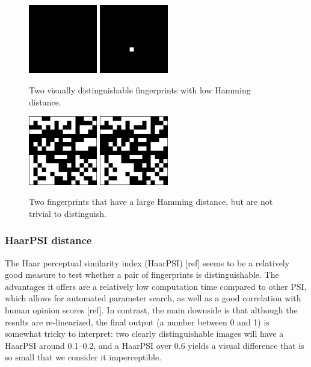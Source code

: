 \documentclass{article}
\begin{document}
\begin{figure}[h]
    \centering
    \includegraphics[width=3cm]{figures/0000000000000.png}
    \includegraphics[width=3cm]{figures/0000000001052.png}
    \caption{Two visually distinguishable fingerprints with low Hamming distance.}
    \label{fig:lowdist}
\end{figure}
\begin{center}
\begin{figure}[h]
    \centering
    \includegraphics[width=3cm]{figures/e7e6bda110965.png}
    \includegraphics[width=3cm]{figures/e7f2bdd111301.png}
    \caption{Two fingerprints that have a large Hamming distance, but are not trivial to distinguish.}
    \label{fig:highdist}
\end{figure}
\end{center}

\subsubsection{HaarPSI distance}
The Haar perceptual similarity index (HaarPSI) [ref] seems to be a relatively good measure to test whether a pair of fingerprints is distinguishable. The advantages it offers are a relatively low computation time compared to other PSI, which allows for automated parameter search, as well as a good correlation with human opinion scores [ref]. In contrast, the main downside is that although the results are re-linearized, the final output (a number between 0 and 1) is somewhat tricky to interpret: two clearly distinguishable images will have a HaarPSI around 0.1--0.2, and a HaarPSI over 0.6 yields a visual difference that is so small that we consider it imperceptible.
\end{document}
